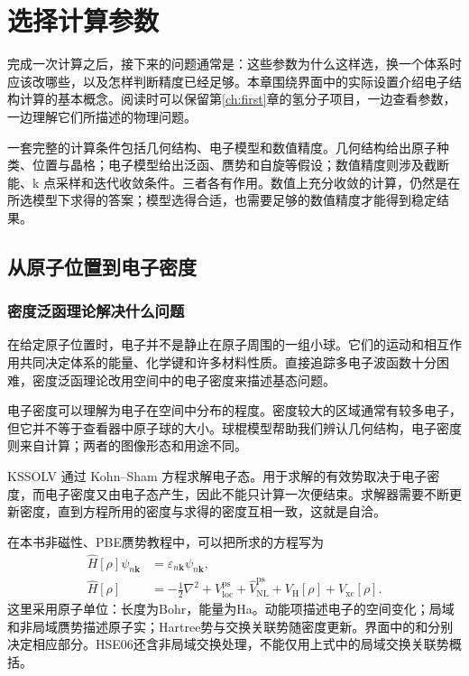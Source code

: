 \chapter{选择计算参数}\label{ch:theory}

完成一次计算之后，接下来的问题通常是：这些参数为什么这样选，换一个体系时应该改哪些，以及怎样判断精度已经足够。本章围绕界面中的实际设置介绍电子结构计算的基本概念。阅读时可以保留第\ref{ch:first}章的氢分子项目，一边查看参数，一边理解它们所描述的物理问题。

一套完整的计算条件包括几何结构、电子模型和数值精度。几何结构给出原子种类、位置与晶格；电子模型给出泛函、赝势和自旋等假设；数值精度则涉及截断能、k 点采样和迭代收敛条件。三者各有作用。数值上充分收敛的计算，仍然是在所选模型下求得的答案；模型选得合适，也需要足够的数值精度才能得到稳定结果。

\section{从原子位置到电子密度}

\subsection{密度泛函理论解决什么问题}

在给定原子位置时，电子并不是静止在原子周围的一组小球。它们的运动和相互作用共同决定体系的能量、化学键和许多材料性质。直接追踪多电子波函数十分困难，密度泛函理论改用空间中的电子密度来描述基态问题。

电子密度可以理解为电子在空间中分布的程度。密度较大的区域通常有较多电子，但它并不等于查看器中原子球的大小。球棍模型帮助我们辨认几何结构，电子密度则来自计算；两者的图像形态和用途不同。

KSSOLV 通过 Kohn--Sham 方程求解电子态。用于求解的有效势取决于电子密度，而电子密度又由电子态产生，因此不能只计算一次便结束。求解器需要不断更新密度，直到方程所用的密度与求得的密度互相一致，这就是自洽。


在本书非磁性、PBE赝势教程中，可以把所求的方程写为
\begin{equation}
  \begin{aligned}
  \widehat H[\rho]\psi_{n\mathbf k}
    &=\varepsilon_{n\mathbf k}\psi_{n\mathbf k},\\
  \widehat H[\rho]&= -\frac12\nabla^2
  +V_{\mathrm{loc}}^{\mathrm{ps}}+\widehat V_{\mathrm{NL}}^{\mathrm{ps}}
  +V_{\mathrm H}[\rho]+V_{\mathrm{xc}}[\rho].
  \end{aligned}
  \label{eq:ks-operator}
\end{equation}
这里采用原子单位：长度为Bohr，能量为Ha。动能项描述电子的空间变化；局域和非局域赝势描述原子实；Hartree势与交换关联势随密度更新。界面中的和分别决定相应部分。HSE06还含非局域交换处理，不能仅用上式中的局域交换关联势概括。

